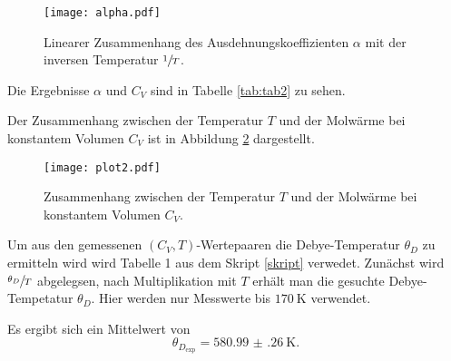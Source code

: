 \begin{figure}[H]
  \texttt{[image: alpha.pdf]}
  \caption{Linearer Zusammenhang des Ausdehnungskoeffizienten $\alpha$ mit der
  inversen Temperatur $\sfrac{1}{T}$.}
  \label{fig:alpha}
\end{figure}

Die Ergebnisse $\alpha$ und $C_V$ sind in Tabelle \ref{tab:tab2} zu sehen.


Der Zusammenhang zwischen der Temperatur $T$ und der Molwärme bei konstantem Volumen
$C_V$ ist in Abbildung \ref{fig:Cv} dargestellt.

\begin{figure}[H]
  \texttt{[image: plot2.pdf]}
  \caption{Zusammenhang zwischen der Temperatur $T$ und der Molwärme bei konstantem Volumen
  $C_V$.}
  \label{fig:Cv}
\end{figure} 

Um aus den gemessenen $(C_V, T)$-Wertepaaren die Debye-Temperatur $\theta_D$ zu ermitteln
wird wird Tabelle 1 aus dem Skript \ref{skript} verwedet. Zunächst wird $\sfrac{\theta_D}{T}$
abgelegsen, nach Multiplikation mit $T$ erhält man die gesuchte Debye-Tempetatur $\theta_D$.
Hier werden nur Messwerte bis $\SI{170}{\K}$ verwendet.

Es ergibt sich ein Mittelwert von
\begin{equation}
  \theta_{D_\text{exp}}=\SI{580.99(26)}{\K}.
\end{equation}

